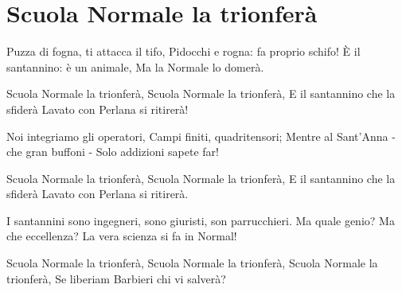 \section{Scuola Normale la trionferà}
\subtitle{Sulla melodia di “Bandiera Rossa”}

\subtitle{Tonalità possibilmente bassa}
\begin{canzone}
Puzza di fogna, ti attacca il tifo,
Pidocchi e rogna: fa proprio schifo!
È il santannino: è un animale,
Ma la Normale lo domerà.

Scuola Normale la trionferà,
Scuola Normale la trionferà,
E il santannino che la sfiderà
Lavato con Perlana si ritirerà!

Noi integriamo gli operatori,
Campi finiti, quadritensori;
Mentre al Sant’Anna - che gran buffoni - 
Solo addizioni sapete far!

Scuola Normale la trionferà,
Scuola Normale la trionferà,
E il santannino che la sfiderà
Lavato con Perlana si ritirerà.

I santannini sono ingegneri,
sono giuristi, son parrucchieri.
Ma quale genio? Ma che eccellenza?
La vera scienza si fa in Normal!

Scuola Normale la trionferà,
Scuola Normale la trionferà,
Scuola Normale la trionferà,
Se liberiam Barbieri chi vi salverà?
\end{canzone}
